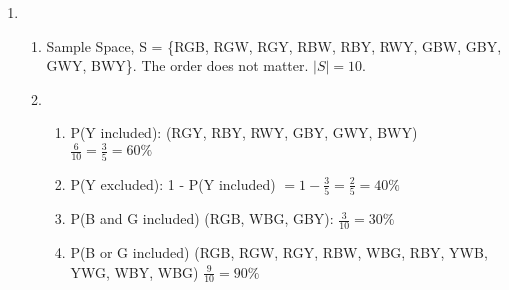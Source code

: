 \documentclass[11pt]{article}
\begin{document}
\begin{flushleft}
\begin{enumerate}
				      				\item {
				      					      
				      					      \begin{enumerate} %
				      					      	\item { %
				      					      		      Sample Space, S = \{RGB, RGW, RGY, RBW, RBY, RWY, GBW, GBY, GWY, BWY\}. The order does not matter. $|S| = 10$.
				      					      		}
				      					      		
				      					      		\item { %
				      					      			      \begin{enumerate}
				      					      			      	\item {P(Y included): (RGY, RBY, RWY, GBY, GWY, BWY) $\frac{6}{10} = \frac{3}{5} = 60\%$} 
				      					      			      	\item {P(Y excluded): 1 - P(Y included) $= 1 - \frac{3}{5} = \frac{2}{5} = 40\%$} 
				      					      			      	\item {P(B and G included) (RGB, WBG, GBY): $\frac{3}{10} = 30\%$ }
				      					      			      	\item {P(B or G included) (RGB, RGW, RGY, RBW, WBG, RBY, YWB, YWG, WBY, WBG) $\frac{9}{10} = 90\%$ }
				      					      			      \end{enumerate}
				      					      			}
				      					      			
				      					      			\
				      					      		\end{enumerate}
				      					      	}
				      					      	

\end{enumerate}
\end{flushleft}
\end{document}
